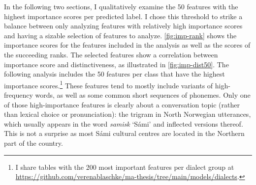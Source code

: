 In the following two sections, I qualitatively examine the 50 features with the highest importance scores per predicted label.
I chose this threshold to strike a balance between only analyzing features with relatively high importance scores and having a sizable selection of features to analyze.
\autoref{fig:imp-rank} shows the importance scores for the features included in the analysis as well as the scores of the succeeding ranks.
The selected features show a correlation between importance score and distinctiveness, as illustrated in \autoref{fig:imp-dist50}.
The following analysis includes the 50 features per class that have the highest importance scores.\footnote{%
I share tables with the 200 most important features per dialect group at \url{https://github.com/verenablaschke/ma-thesis/tree/main/models/dialects}.
}
These features tend to mostly include variants of high-frequency words, as well as some common short sequences of phonemes.
Only one of those high-importance features is clearly about a conversation topic (rather than lexical choice or pronunciation): the trigram  in North Norwegian utterances, which usually appears in the word \textit{samisk} `Sámi' and inflected versions thereof.
This is not a surprise as most Sámi cultural centres are located in the Northern part of the country.



